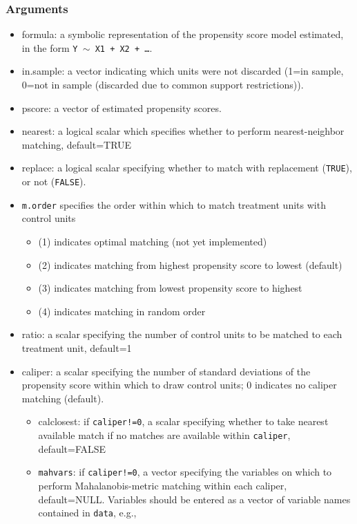 \documentclass[oneside,letterpaper,titlepage]{article}
\begin{document}
\begin{appendix}
\subsubsection{Arguments}
\begin{itemize}
\item{formula}: a symbolic representation of the propensity score
  model estimated, in the form {\tt Y $\sim$ X1 + X2 + \dots}.
\item{in.sample}: a vector indicating which units were not discarded (1=in sample, 0=not in sample (discarded due to common support restrictions)). 
\item{pscore}: a vector of estimated propensity scores. 
\item{nearest}: a logical scalar which specifies whether
  to perform nearest-neighbor matching, default=TRUE 
\item{replace}: a logical scalar specifying whether to match with
  replacement (\texttt{TRUE}), or not (\texttt{FALSE}). 
\item \texttt{m.order}  specifies the order within which to match
  treatment units with control units
  \begin{itemize}
  \item (1) indicates optimal matching (not yet implemented)
  \item (2) indicates matching from highest propensity score to
    lowest (default)
  \item (3) indicates matching from lowest propensity score to
    highest
  \item (4) indicates matching in random order
  \end{itemize}
\item{ratio}: a scalar specifying the number of control units to be matched to
  each treatment unit, default=1
\item{caliper}: a scalar specifying the number of standard deviations of 
  the propensity score within which to draw control units; 0 indicates
  no caliper matching (default).
  \begin{itemize}
  \item{calclosest}: if \texttt{caliper!=0}, a scalar specifying whether to take nearest
    available match if no matches are available within \texttt{caliper}, default=FALSE
  \item\texttt{mahvars}: if \texttt{caliper!=0}, a vector specifying
    the variables on which to perform Mahalanobis-metric matching
    within each caliper, default=NULL.  Variables should be entered as
    a vector of variable names contained in \texttt{data}, e.g.,

\end{itemize}
\end{itemize}
\end{appendix}
\end{document}

